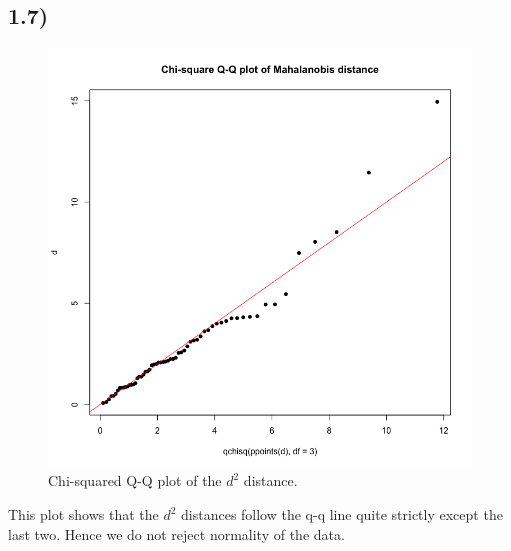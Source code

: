 \documentclass[a4paper,11pt,oneside]{report}
\begin{document}
\subsection*{1.7)}
	\begin{figure}[H]
	\centering
	\includegraphics[scale = 0.35]{Mahala_q_q_chi.png}
	\caption{Chi-squared Q-Q plot of the $d^2$ distance.}
	\end{figure}
	This plot shows that the $d^2$ distances follow the q-q line quite strictly except the last two. Hence we do not reject normality of the data.
	
\end{document}
